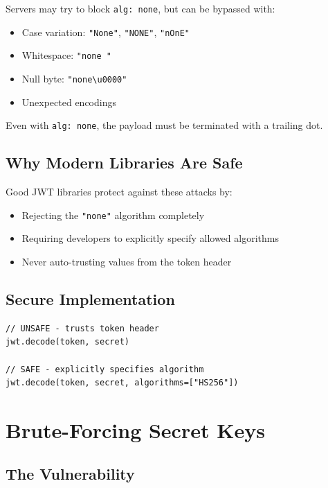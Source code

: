 \documentclass{article}
\begin{document}
Servers may try to block \texttt{alg: none}, but can be bypassed with:

\begin{itemize}
    \item Case variation: \texttt{"None"}, \texttt{"NONE"}, \texttt{"nOnE"}
    \item Whitespace: \texttt{"none "}
    \item Null byte: \texttt{"none\textbackslash u0000"}
    \item Unexpected encodings
\end{itemize}

\begin{notebox}[Important]
Even with \texttt{alg: none}, the payload must be terminated with a trailing dot.
\end{notebox}

\subsection{Why Modern Libraries Are Safe}

Good JWT libraries protect against these attacks by:

\begin{itemize}
    \item Rejecting the \texttt{"none"} algorithm completely
    \item Requiring developers to explicitly specify allowed algorithms
    \item Never auto-trusting values from the token header
\end{itemize}

\subsection{Secure Implementation}

\begin{lstlisting}[caption=Secure JWT Verification]
// UNSAFE - trusts token header
jwt.decode(token, secret)

// SAFE - explicitly specifies algorithm
jwt.decode(token, secret, algorithms=["HS256"])
\end{lstlisting}

\section{Brute-Forcing Secret Keys}

\subsection{The Vulnerability}
\end{document}
